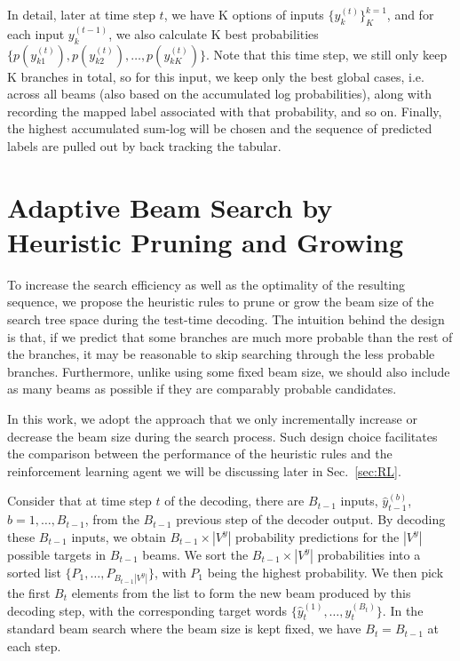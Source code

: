 \documentclass[11pt,a4paper]{article}
\begin{document}
In detail, later at time step $t$, we have K options of inputs $\{ y^{(t)}_k\}^{k=1}_K$, and for each input $y^{(t-1)}_{k}$, we also calculate K best probabilities $\{ p({y}^{(t)}_{k1}), p({y}^{(t)}_{k2}), \dots, p({y}^{(t)}_{kK}) \}$. Note that this time step, we still only keep K branches in total, so for this input, we keep only the best global cases, i.e. across all beams (also based on the accumulated log probabilities), along with recording the mapped label associated with that probability, and so on. Finally, the highest accumulated sum-log will be chosen and the sequence of predicted labels are pulled out by back tracking the tabular. 


\section{Adaptive Beam Search by Heuristic Pruning and Growing}
\label{sec:Heuristic}

To increase the search efficiency as well as the optimality of the resulting sequence, we propose the heuristic rules to prune or grow the beam size of the search tree space during the test-time decoding. The intuition behind the design is that, if we predict that some branches are much more probable than the rest of the branches, it may be reasonable to skip searching through the less probable branches. Furthermore, unlike using some fixed beam size, we should also include as many beams as possible if they are comparably probable candidates.

In this work, we adopt the approach that we only incrementally increase or decrease the beam size during the search process. Such design choice facilitates the comparison between the performance of the heuristic rules and the reinforcement learning agent we will be discussing later in Sec.~\ref{sec:RL}.

Consider that at time step $t$ of the decoding, there are $B_{t-1}$ inputs, $\hat{y}_{t-1}^{(b)}$, $b = 1, \dots, B_{t-1}$, from the $B_{t-1}$ previous step of the decoder output. By decoding these $B_{t-1}$ inputs, we obtain $B_{t-1} \times |V^y|$ probability predictions for the $|V^y|$ possible targets in $B_{t-1}$ beams. We sort the $B_{t-1} \times |V^y|$ probabilities into a sorted list $\{ P_1, \dots, P_{B_{t-1} |V^y|} \}$, with $P_1$ being the highest probability. We then pick the first $B_t$ elements from the list to form the new beam produced by this decoding step, with the corresponding target words $\{ \hat{y}_{t}^{(1)}, \dots, \hat{y}_{t}^{(B_t)} \}$. In the standard beam search where the beam size is kept fixed, we have $B_t = B_{t-1}$ at each step.
\end{document}

